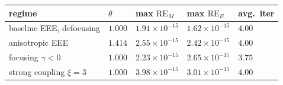 \begin{tabular}{lllll}
\toprule
regime & $\theta$ & max $\mathrm{RE}_M$ & max $\mathrm{RE}_E$ & avg.\ iter \\
\midrule
baseline EEE, defocusing & \(1.000\) & \(1.91\times10^{-15}\) & \(1.62\times10^{-15}\) & \(4.00\) \\
anisotropic EEE & \(1.414\) & \(2.55\times10^{-15}\) & \(2.42\times10^{-15}\) & \(4.00\) \\
focusing $\gamma<0$ & \(1.000\) & \(2.23\times10^{-15}\) & \(2.65\times10^{-15}\) & \(3.75\) \\
strong coupling $\xi=3$ & \(1.000\) & \(3.98\times10^{-15}\) & \(3.01\times10^{-15}\) & \(4.00\) \\
\bottomrule
\end{tabular}

